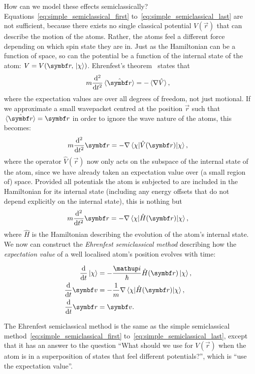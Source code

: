 How can we model these effects semiclassically? Equations~\eqref{eq:simple_semiclassical_first} to~\eqref{eq:simple_semiclassical_last} are not sufficient, because there exists no single classical potential $V(\vec r)$ that can describe the motion of the atoms. Rather, the atoms feel a different force depending on which spin state they are in. Just as the Hamiltonian can be a function of space, so can the potential be a function of the internal state of the atom: $V = V(\vec{r}, \ket\chi)$. Ehrenfest's theorem~\cite{Ehrenfest1927} states that
\begin{align}
m\dv[2]{t}\ev{\hat{\vec r}} = - \ev{\nabla \hat V},
\end{align}
where the expectation values are over all degrees of freedom, not just motional. If we approximate a small wavepacket centred at the position $\vec r$ such that $\ev{\hat{\vec r}} = \vec r$ in order to ignore the wave nature of the atoms, this becomes:
\begin{align}
m\dv[2]{t} \vec r = - \nabla \matrixel{\chi}{\hat V(\vec r)}{\chi},
\end{align}
where the operator $\hat V(\vec r)$ now only acts on the subspace of the internal state of the atom, since we have already taken an expectation value over (a small region of) space. Provided all potentials the atom is subjected to are included in the Hamiltonian for its internal state (including any energy offsets that do not
depend explicitly on the internal state), this is nothing but
\begin{align}
m\dv[2]{t} \vec r = - \nabla \matrixel{\chi}{\hat H(\vec r)}{\chi},
\end{align}
where $\hat H$ is the Hamiltonian describing the evolution of the atom's internal state. We now can construct the \emph{Ehrenfest semiclassical method} describing how the \emph{expectation value} of a well localised atom's position evolves with time:

\begin{align}\label{eq:ehrenfest_semiclassical_first}
\dv{t}\ket\chi &= -\frac\ii\hbar \hat H(\vec r)\ket\chi,\\
\dv{t}\vec v &= -\frac1m \nabla \matrixel{\chi}{\hat H(\vec r)}{\chi},\\
\dv{t}\vec r &= \vec v\label{eq:ehrenfest_semiclassical_last}.
\end{align}

The Ehrenfest semiclassical method is the same as the simple semiclassical method~\eqref{eq:simple_semiclassical_first} to~\eqref{eq:simple_semiclassical_last}, except that it has an answer to the question ``What should we use for $V(\vec r)$ when the atom is in a superposition of states that feel different potentials?'', which is ``use the expectation value''. 

